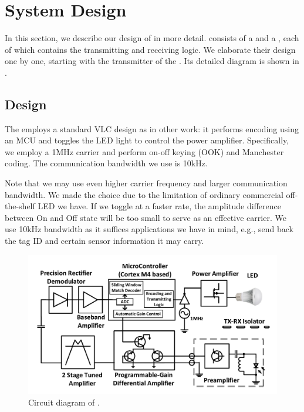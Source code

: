 \section{\retro System Design}\label{design}
In this section, we describe our design of \retro in more detail. \retro consists of a \reader and a \vitag, each of which contains the transmitting and receiving logic. We elaborate their design one by one, starting with the transmitter of the \reader. Its detailed diagram is shown in .

\subsection{\readertx Design}
The \readertx employs a standard VLC design as in other work:  it performs encoding using an MCU and toggles the LED light to control the power amplifier. Specifically, we employ a 1MHz carrier and perform on-off keying (OOK) and Manchester coding. The communication bandwidth we use is 10kHz. 

Note that we may use even higher carrier frequency and larger communication bandwidth. We made the choice due to the limitation of ordinary commercial off-the-shelf LED we have. If we toggle at a faster rate, the amplitude difference between On and Off state will be too small to serve as an effective carrier. We use 10kHz bandwidth as it suffices applications we have in mind, e.g., send back the tag ID and certain sensor information it may carry.



\begin{figure}[!th]
\centering
\includegraphics[width=\columnwidth]{fig/read_diagram.pdf}
\vspace{-1em}
\caption{Circuit diagram of \reader. }
\label{fig:diagram_reader}
\end{figure}

